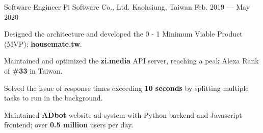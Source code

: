 \begin{cventries}
  \cventry
    {Software Engineer } %
    {Pi Software Co., Ltd.} %
    {Kaohsiung, Taiwan} %
    {Feb. 2019 --- May 2020} %
    {
      \begin{cvitems} %
        \item {Designed the architecture and developed the 0 - 1 Minimum Viable Product (MVP); \textbf{housemate.tw}.}
        \item {Maintained and optimized the \textbf{zi.media} API server, reaching a peak Alexa Rank of \textbf{\#33} in Taiwan.}
        \item {Solved the issue of response times exceeding \textbf{10 seconds} by splitting multiple tasks to run in the background.}
        \item {Maintained \textbf{ADbot} website ad system with Python backend and Javascript frontend; over \textbf{0.5 million} users per day.}
      \end{cvitems}
    }

\end{cventries}
